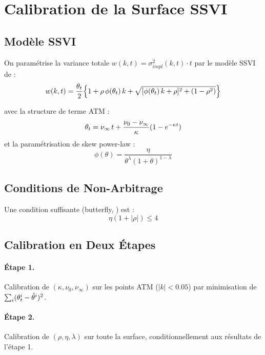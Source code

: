 \section{Calibration de la Surface SSVI}
\label{sec:ssvi}

\subsection{Modèle SSVI}

On paramétrise la variance totale $w(k, t) = \sigma_{impl}^2(k,t)\cdot t$ par
le modèle SSVI de \citet{gatheral2014arbitrage} :
\begin{equation}
  w(k, t) = \frac{\theta_t}{2}\!\left\{
    1 + \rho\,\phi(\theta_t)\,k
    + \sqrt{[\phi(\theta_t)\,k + \rho]^2 + (1-\rho^2)}
  \right\}
  \label{eq:ssvi}
\end{equation}

avec la structure de terme ATM :
\begin{equation}
  \theta_t = \nu_\infty\,t + \frac{\nu_0 - \nu_\infty}{\kappa}(1 - e^{-\kappa t})
\end{equation}
et la paramétrisation de skew power-law :
\begin{equation}
  \phi(\theta) = \frac{\eta}{\theta^\lambda(1+\theta)^{1-\lambda}}
\end{equation}

\subsection{Conditions de Non-Arbitrage}

Une condition suffisante (butterfly, \citealt{gatheral2014arbitrage}) est :
\begin{equation}
  \eta(1 + |\rho|) \leq 4
\end{equation}

\subsection{Calibration en Deux Étapes}

\paragraph{Étape 1.} Calibration de $(\kappa, \nu_0, \nu_\infty)$ sur les
points ATM ($|k| < 0.05$) par minimisation de $\sum_i (\theta_t^i - \hat{\theta}^i)^2$.

\paragraph{Étape 2.} Calibration de $(\rho, \eta, \lambda)$ sur toute la
surface, conditionnellement aux résultats de l'étape 1.

